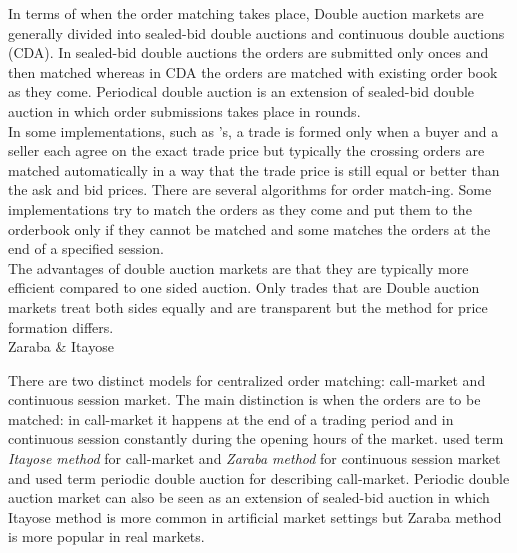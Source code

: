 

In terms of when the order matching takes place, 
Double auction markets are generally divided into sealed-bid double 
auctions and continuous double auctions (CDA). In sealed-bid double 
auctions the orders are submitted only onces and then matched 
whereas in CDA the orders are matched with existing order book
as they come. Periodical double auction is an extension of sealed-bid 
double auction in which order submissions takes place in rounds. \citep*{Moc15} \\


In some implementations, such as \citet{God93}'s, a 
trade is formed only when a buyer and a seller each agree on 
the exact trade price but typically the crossing orders are matched 
automatically in a way that the trade price is still equal or better 
than the ask and bid prices. There are several algorithms for order 
match-ing. Some implementations try to match the orders as they come 
and put them to the orderbook only if they cannot be matched and some 
matches the orders at the end of a specified session. \\

The advantages of double auction markets are that they are typically more efficient compared to one sided auction. Only trades that are
Double auction markets treat both sides equally and are transparent but the method for price formation differs.\\



Zaraba & Itayose

There are two distinct models for centralized order matching:
call-market and continuous session market. The main distinction
is when the orders are to be matched: in call-market it happens
at the end of a trading period and in continuous session constantly
during the opening hours of the market. \citep{boer05} \citet{ASt05} 
used term \textit{Itayose method} for call-market and \textit{Zaraba method} for 
continuous session market and \citet{Moc15} used term periodic double auction
for describing call-market. Periodic double auction market can also be seen as 
an extension of sealed-bid auction in which 
Itayose method
is more common in artificial market settings but Zaraba method 
is more popular in real markets. 


